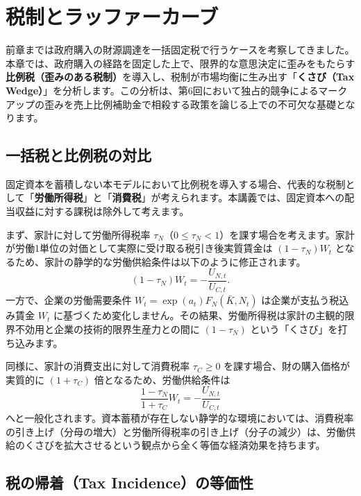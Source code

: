 \documentclass[
  japanese,
  lualatex,
  ja=standard,
  12pt,
  a4paper]{ltjsarticle}
\begin{document}
\section{税制とラッファーカーブ}\label{ux7a0eux5236ux3068ux30e9ux30c3ux30d5ux30a1ux30fcux30abux30fcux30d6}

前章までは政府購入の財源調達を一括固定税で行うケースを考察してきました。本章では、政府購入の経路を固定した上で、限界的な意思決定に歪みをもたらす\textbf{比例税（歪みのある税制）}を導入し、税制が市場均衡に生み出す「\textbf{くさび（Tax
Wedge）}」を分析します。この分析は、第6回において独占的競争によるマークアップの歪みを売上比例補助金で相殺する政策を論じる上での不可欠な基礎となります。

\subsection{一括税と比例税の対比}\label{ux4e00ux62ecux7a0eux3068ux6bd4ux4f8bux7a0eux306eux5bfeux6bd4}

固定資本を蓄積しない本モデルにおいて比例税を導入する場合、代表的な税制として「\textbf{労働所得税}」と「\textbf{消費税}」が考えられます。本講義では、固定資本への配当収益に対する課税は除外して考えます。

まず、家計に対して労働所得税率
\(\tau_N\)（\(0 \leq \tau_N < 1\)）を課す場合を考えます。家計が労働1単位の対価として実際に受け取る税引き後実質賃金は
\((1-\tau_N)W_t\)
となるため、家計の静学的な労働供給条件は以下のように修正されます。 \[
(1-\tau_N) W_t = -\frac{U_{N,t}}{U_{C,t}}.
\] 一方で、企業の労働需要条件 \(W_t = \exp(a_t) F_N(\bar{K}, N_t)\)
は企業が支払う税込み賃金 \(W_t\)
に基づくため変化しません。その結果、労働所得税は家計の主観的限界不効用と企業の技術的限界生産力との間に
\((1-\tau_N)\) という「くさび」を打ち込みます。

同様に、家計の消費支出に対して消費税率 \(\tau_C \geq 0\)
を課す場合、財の購入価格が実質的に \((1+\tau_C)\)
倍となるため、労働供給条件は \[
\frac{1-\tau_N}{1+\tau_C} W_t = -\frac{U_{N,t}}{U_{C,t}}
\]
へと一般化されます。資本蓄積が存在しない静学的な環境においては、消費税率の引き上げ（分母の増大）と労働所得税率の引き上げ（分子の減少）は、労働供給のくさびを拡大させるという観点から全く等価な経済効果を持ちます。

\subsection{税の帰着（Tax
Incidence）の等価性}\label{ux7a0eux306eux5e30ux7740tax-incidenceux306eux7b49ux4fa1ux6027}
\end{document}
